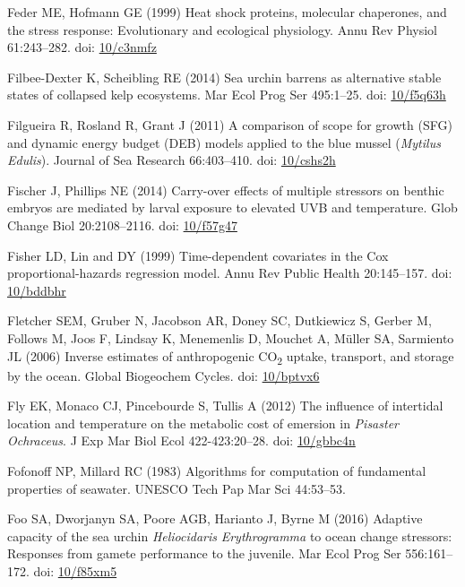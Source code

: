 \documentclass[a4paper,10pt, oneside]{memoir}
\begin{document}
\leavevmode\hypertarget{ref-Feder1999}{}%
Feder ME, Hofmann GE (1999) Heat shock proteins, molecular chaperones, and the stress response: Evolutionary and ecological physiology. Annu Rev Physiol 61:243--282. doi: \href{https://doi.org/10/c3nmfz}{10/c3nmfz}

\leavevmode\hypertarget{ref-Filbee-Dexter2014}{}%
Filbee-Dexter K, Scheibling RE (2014) Sea urchin barrens as alternative stable states of collapsed kelp ecosystems. Mar Ecol Prog Ser 495:1--25. doi: \href{https://doi.org/10/f5q63h}{10/f5q63h}

\leavevmode\hypertarget{ref-Filgueira2011}{}%
Filgueira R, Rosland R, Grant J (2011) A comparison of scope for growth (SFG) and dynamic energy budget (DEB) models applied to the blue mussel (\emph{Mytilus} \emph{Edulis}). Journal of Sea Research 66:403--410. doi: \href{https://doi.org/10/cshs2h}{10/cshs2h}

\leavevmode\hypertarget{ref-Fischer2014}{}%
Fischer J, Phillips NE (2014) Carry-over effects of multiple stressors on benthic embryos are mediated by larval exposure to elevated UVB and temperature. Glob Change Biol 20:2108--2116. doi: \href{https://doi.org/10/f57g47}{10/f57g47}

\leavevmode\hypertarget{ref-Fisher1999}{}%
Fisher LD, Lin and DY (1999) Time-dependent covariates in the Cox proportional-hazards regression model. Annu Rev Public Health 20:145--157. doi: \href{https://doi.org/10/bddbhr}{10/bddbhr}

\leavevmode\hypertarget{ref-Fletcher2006}{}%
Fletcher SEM, Gruber N, Jacobson AR, Doney SC, Dutkiewicz S, Gerber M, Follows M, Joos F, Lindsay K, Menemenlis D, Mouchet A, Müller SA, Sarmiento JL (2006) Inverse estimates of anthropogenic CO\textsubscript{2} uptake, transport, and storage by the ocean. Global Biogeochem Cycles. doi: \href{https://doi.org/10/bptvx6}{10/bptvx6}

\leavevmode\hypertarget{ref-Fly2012}{}%
Fly EK, Monaco CJ, Pincebourde S, Tullis A (2012) The influence of intertidal location and temperature on the metabolic cost of emersion in \emph{Pisaster} \emph{Ochraceus}. J Exp Mar Biol Ecol 422-423:20--28. doi: \href{https://doi.org/10/gbbc4n}{10/gbbc4n}

\leavevmode\hypertarget{ref-Fofonoff1983}{}%
Fofonoff NP, Millard RC (1983) Algorithms for computation of fundamental properties of seawater. UNESCO Tech Pap Mar Sci 44:53--53.

\leavevmode\hypertarget{ref-Foo2016}{}%
Foo SA, Dworjanyn SA, Poore AGB, Harianto J, Byrne M (2016) Adaptive capacity of the sea urchin \emph{Heliocidaris} \emph{Erythrogramma} to ocean change stressors: Responses from gamete performance to the juvenile. Mar Ecol Prog Ser 556:161--172. doi: \href{https://doi.org/10/f85xm5}{10/f85xm5}
\end{document}
